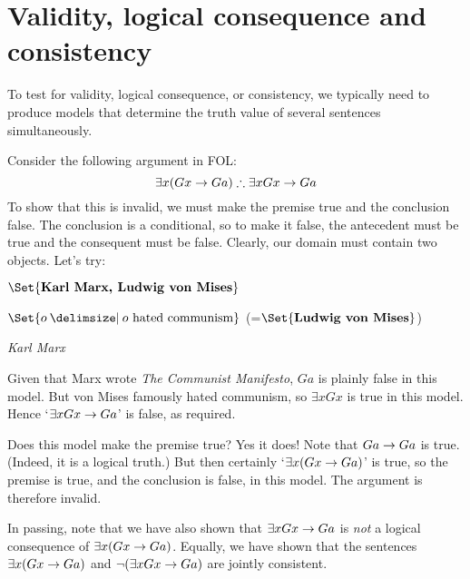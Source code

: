 
\section{Validity, logical consequence and consistency}
To test for validity, logical consequence, or consistency, we typically need to produce models that determine the truth value of several sentences simultaneously.

Consider the following argument in FOL:
$$\exists x(Gx \eif Ga) \therefore \exists x Gx \eif Ga$$
To show that this is invalid, we must make the premise true and the conclusion false. The conclusion is a conditional, so to make it false, the antecedent must be true and the consequent must be false. Clearly, our domain must contain two objects. Let's try:
	\begin{interp}
		\item[\domain] $\Set{\text{\emph{Karl Marx, Ludwig von Mises}}}$
		\item[\denote{G}] $\Set{o \given o\text{ hated communism}}$ (=$\Set{\emph{Ludwig von Mises}}$)
		\item[\denote{a}] \emph{Karl Marx}
	\end{interp}
Given that Marx wrote \emph{The Communist Manifesto}, $Ga$ is plainly false in this model. But von Mises famously hated communism, so $\exists x Gx$ is true in this model. Hence `$\exists x Gx \rightarrow Ga$' is false, as required.

Does this model make the premise true? Yes it does! Note that $Ga \rightarrow Ga$ is true. (Indeed, it is a logical truth.) But then certainly `$\exists x (Gx \rightarrow Ga)$' is true, so the premise is true, and the conclusion is false, in this model. The argument is therefore invalid.

In passing, note that we have also shown that $\exists x Gx \rightarrow Ga$ is \emph{not} a logical consequence of $\exists x(Gx \rightarrow Ga)$. Equally, we have shown that the sentences $\exists x (Gx \rightarrow Ga)$ and $\neg (\exists x Gx \rightarrow Ga)$ are jointly consistent.

